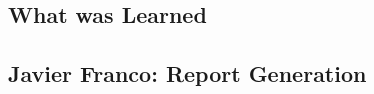 \documentclass[letterpaper,10pt,serif,draftclsnofoot,onecolumn,compsoc,titlepage]{IEEEtran}
\begin{document}
\subsection{What was Learned}


\subsection{Javier Franco: Report Generation}

%
%
\begin{appendices}

\end{appendices}
\end{document}
